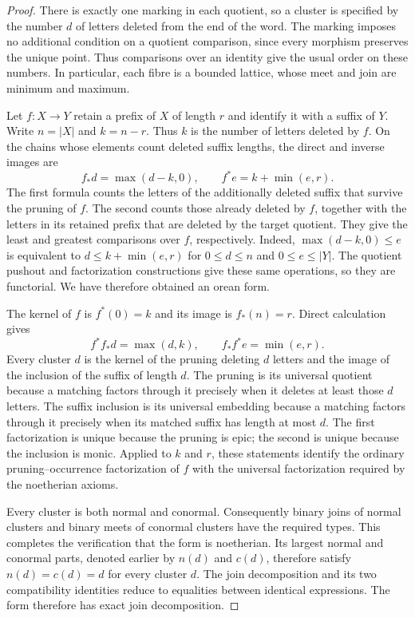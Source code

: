 \documentclass[11pt,a4paper]{article}
\theoremstyle{plain}
\theoremstyle{definition}
\theoremstyle{remark}
\begin{document}
\begin{proof}
There is exactly one marking in each quotient, so a cluster is
specified by the number $d$ of letters deleted from the end of
the word. The marking imposes no additional condition on a
quotient comparison, since every morphism preserves the unique
point. Thus comparisons over an identity give the usual order
on these numbers. In particular, each fibre is a bounded lattice,
whose meet and join are minimum and maximum.

Let $f:X\to Y$ retain a prefix of $X$ of length
$r$ and identify it with a suffix of $Y$. Write $n=|X|$ and
$k=n-r$. Thus $k$ is the number of letters deleted by $f$.
On the chains whose elements count deleted suffix lengths, the
direct and inverse images are
\[
 f_*d=\max(d-k,0),\qquad f^*e=k+\min(e,r).
\]
The first formula counts the letters of the additionally deleted
suffix that survive the pruning of $f$. The second counts
those already deleted by $f$, together with the letters in its
retained prefix that are deleted by the target quotient. They
give the least and greatest comparisons over $f$, respectively.
Indeed, $\max(d-k,0)\le e$ is equivalent to
$d\le k+\min(e,r)$ for $0\le d\le n$ and
$0\le e\le |Y|$. The quotient pushout and factorization
constructions give these same operations, so they are functorial.
We have therefore obtained an orean form.

The kernel of $f$ is $f^*(0)=k$ and its image is
$f_*(n)=r$. Direct calculation gives
\[
 f^*f_*d=\max(d,k),\qquad f_*f^*e=\min(e,r).
\]
Every cluster $d$ is the kernel of the pruning deleting $d$
letters and the image of the inclusion of the suffix of length
$d$. The pruning is its universal quotient because a matching
factors through it precisely when it deletes at least those
$d$ letters. The suffix inclusion is its universal embedding
because a matching factors through it precisely when its matched
suffix has length at most $d$. The first factorization is unique
because the pruning is epic; the second is unique because the
inclusion is monic. Applied to $k$ and $r$, these statements
identify the ordinary pruning--occurrence factorization of $f$
with the universal factorization required by the noetherian axioms.

Every cluster is both normal and conormal. Consequently binary
joins of normal clusters and binary meets of conormal clusters
have the required types. This completes the verification that
the form is noetherian. Its largest normal and conormal parts,
denoted earlier by $n(d)$ and $c(d)$, therefore satisfy
$n(d)=c(d)=d$ for every cluster $d$. The join decomposition and its two compatibility
identities reduce to equalities between identical expressions.
The form therefore has exact join decomposition.
\end{proof}
\end{document}
